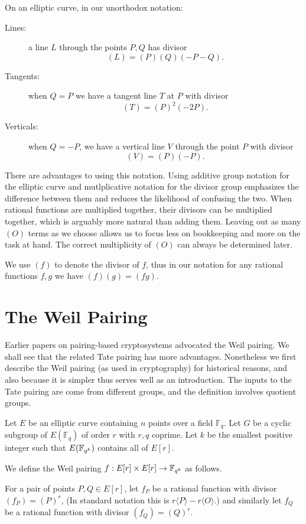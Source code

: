 On an elliptic curve, in our unorthodox notation:
\begin{description}
\item[Lines:]
a line $L$ through the points $P, Q$ has divisor
\[ (L) = (P)(Q)(-P-Q) . \]
\item[Tangents:]
when $Q = P$ we have a tangent line $T$ at $P$ with divisor
\[ (T) = (P)^2 (-2P) . \]
\item[Verticals:]
when $Q = -P$, we have a vertical line $V$ through the point $P$
with divisor
\[ (V) = (P)(-P) . \]
\end{description}

There are advantages to using this notation. Using additive group
notation for the elliptic curve and mutlplicative notation for the divisor
group emphasizes the difference between them and reduces the likelihood of
confusing the two. When rational functions are multiplied together,
their divisors can be multiplied together, which is arguably
more natural than adding them.
Leaving out as many $(O)$ terms as we choose allows us to focus less on
bookkeeping and more on the task at hand.
The correct multiplicity of $(O)$ can always be determined later.

We use
$(f)$ to denote the divisor of $f$, thus in our notation
for any rational functions $f, g$ we have $(f)(g) = (f g)$.

\section {The Weil Pairing}

Earlier papers on pairing-based cryptosystems advocated the Weil pairing.
We shall see that the related Tate pairing has more advantages.
Nonetheless we first describe the Weil pairing (as used in cryptography)
for historical reasons, and also because it is simpler thus
serves well as an introduction. The inputs to the Tate pairing are come
from different groups, and the definition involves quotient groups.

Let $E$ be an elliptic curve containing $n$ points over a field $\mathbb{F}_q$.
Let $G$ be a cyclic subgroup of $E(\mathbb{F}_q)$ of order $r$ with $r, q$
coprime. Let $k$ be the smallest positive integer such that $E(\mathbb{F}_{q^k})$
contains all of $E[r]$.

We define the Weil pairing
$f:E[r] \times E[r] \rightarrow \mathbb{F}_{q^k}$ as follows.

For a pair of points $P, Q \in E[r]$,
let $f_P$ be a rational function with divisor $(f_P) = (P)^r$,
(In standard notation this is $r\langle P\rangle  - r\langle O\rangle$.)
and similarly let $f_Q$ be a rational function with divisor $(f_Q) = (Q)^r$.

